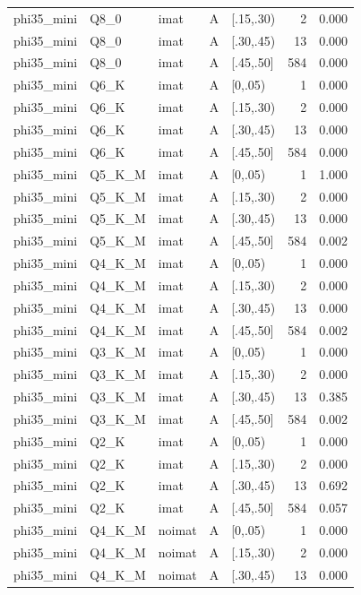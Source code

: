 \begin{tabular}{lllllrr}
phi35\_mini & Q8\_0 & imat & A & [.15,.30) & 2 & 0.000 \\
phi35\_mini & Q8\_0 & imat & A & [.30,.45) & 13 & 0.000 \\
phi35\_mini & Q8\_0 & imat & A & [.45,.50] & 584 & 0.000 \\
phi35\_mini & Q6\_K & imat & A & [0,.05) & 1 & 0.000 \\
phi35\_mini & Q6\_K & imat & A & [.15,.30) & 2 & 0.000 \\
phi35\_mini & Q6\_K & imat & A & [.30,.45) & 13 & 0.000 \\
phi35\_mini & Q6\_K & imat & A & [.45,.50] & 584 & 0.000 \\
phi35\_mini & Q5\_K\_M & imat & A & [0,.05) & 1 & 1.000 \\
phi35\_mini & Q5\_K\_M & imat & A & [.15,.30) & 2 & 0.000 \\
phi35\_mini & Q5\_K\_M & imat & A & [.30,.45) & 13 & 0.000 \\
phi35\_mini & Q5\_K\_M & imat & A & [.45,.50] & 584 & 0.002 \\
phi35\_mini & Q4\_K\_M & imat & A & [0,.05) & 1 & 0.000 \\
phi35\_mini & Q4\_K\_M & imat & A & [.15,.30) & 2 & 0.000 \\
phi35\_mini & Q4\_K\_M & imat & A & [.30,.45) & 13 & 0.000 \\
phi35\_mini & Q4\_K\_M & imat & A & [.45,.50] & 584 & 0.002 \\
phi35\_mini & Q3\_K\_M & imat & A & [0,.05) & 1 & 0.000 \\
phi35\_mini & Q3\_K\_M & imat & A & [.15,.30) & 2 & 0.000 \\
phi35\_mini & Q3\_K\_M & imat & A & [.30,.45) & 13 & 0.385 \\
phi35\_mini & Q3\_K\_M & imat & A & [.45,.50] & 584 & 0.002 \\
phi35\_mini & Q2\_K & imat & A & [0,.05) & 1 & 0.000 \\
phi35\_mini & Q2\_K & imat & A & [.15,.30) & 2 & 0.000 \\
phi35\_mini & Q2\_K & imat & A & [.30,.45) & 13 & 0.692 \\
phi35\_mini & Q2\_K & imat & A & [.45,.50] & 584 & 0.057 \\
phi35\_mini & Q4\_K\_M & noimat & A & [0,.05) & 1 & 0.000 \\
phi35\_mini & Q4\_K\_M & noimat & A & [.15,.30) & 2 & 0.000 \\
phi35\_mini & Q4\_K\_M & noimat & A & [.30,.45) & 13 & 0.000 \\

\end{tabular}
